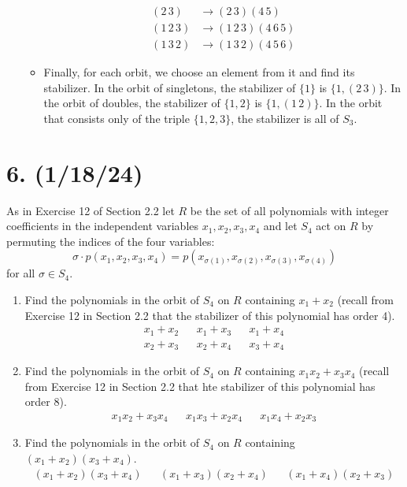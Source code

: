 \documentclass{article}
\begin{document}
\begin{enumerate}[itemsep=0em,label=(\alph*)]
\begin{itemize}[itemsep=0em]
\begin{align*}
                (2\,3) &\rightarrow (2\,3)(4\,5) \\
                (1\,2\,3) &\rightarrow (1\,2\,3)(4\,6\,5) \\
                (1\,3\,2) &\rightarrow (1\,3\,2)(4\,5\,6)
            \end{align*}
            \item Finally, for each orbit, we choose an element from it and find its stabilizer. In the orbit of singletons, the stabilizer of $\{ 1 \}$ is $\{ 1, (2\,3) \}$. In the orbit of doubles, the stabilizer of $\{ 1, 2 \}$ is $\{ 1, (1\,2) \}$. In the orbit that consists only of the triple $\{ 1, 2, 3 \}$, the stabilizer is all of $S_3$.
        \end{itemize}
\end{enumerate}

\section*{6. (1/18/24)}

As in Exercise 12 of Section 2.2 let $R$ be the set of all polynomials with integer coefficients in the independent variables $x_1, x_2, x_3, x_4$ and let $S_4$ act on $R$ by permuting the indices of the four variables:
\begin{equation*}
    \sigma \cdot p(x_1, x_2, x_3, x_4) = p(x_{\sigma(1)}, x_{\sigma(2)}, x_{\sigma(3)}, x_{\sigma(4)})
\end{equation*}
for all $\sigma \in S_4$.

\begin{enumerate}[itemsep=0em, label=(\alph*)]
    \item Find the polynomials in the orbit of $S_4$ on $R$ containing $x_1 + x_2$ (recall from Exercise 12 in Section 2.2 that the stabilizer of this polynomial has order 4).
        \begin{align*}
            x_1 + x_2 & & x_1 + x_3 & & x_1 + x_4 \\
            x_2 + x_3 & & x_2 + x_4 & & x_3 + x_4
        \end{align*}
    \item Find the polynomials in the orbit of $S_4$ on $R$ containing $x_1 x_2 + x_3 x_4$ (recall from Exercise 12 in Section 2.2 that hte stabilizer of this polynomial has order 8).
        \begin{align*}
            x_1 x_2 + x_3 x_4 & & x_1 x_3 + x_2 x_4 & & x_1 x_4 + x_2 x_3
        \end{align*}
    \item Find the polynomials in the orbit of $S_4$ on $R$ containing $(x_1 + x_2)(x_3 + x_4)$.
        \begin{align*}
            (x_1 + x_2)(x_3 + x_4) & & (x_1 + x_3)(x_2 + x_4) & & (x_1 + x_4)(x_2 + x_3)
        \end{align*}
\end{enumerate}
\end{document}
